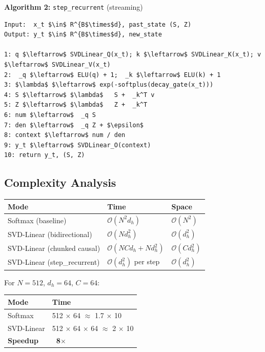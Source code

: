 \textbf{Algorithm 2:} \texttt{step\_recurrent} (streaming)
\begin{lstlisting}
Input:  x_t $\in$ R^{B$\times$d}, past_state (S, Z)
Output: y_t $\in$ R^{B$\times$d}, new_state

1: q $\leftarrow$ SVDLinear_Q(x_t); k $\leftarrow$ SVDLinear_K(x_t); v $\leftarrow$ SVDLinear_V(x_t)
2:  _q $\leftarrow$ ELU(q) + 1;  _k $\leftarrow$ ELU(k) + 1
3: $\lambda$ $\leftarrow$ exp(-softplus(decay_gate(x_t)))
4: S $\leftarrow$ $\lambda$   S +  _k^T v
5: Z $\leftarrow$ $\lambda$   Z +  _k^T
6: num $\leftarrow$  _q S
7: den $\leftarrow$  _q Z + $\epsilon$
8: context $\leftarrow$ num / den
9: y_t $\leftarrow$ SVDLinear_O(context)
10: return y_t, (S, Z)
\end{lstlisting}

\subsection{Complexity Analysis}

\begin{table}[H]
\centering
\small
\begin{tabular}{lll}
\toprule
\textbf{Mode} & \textbf{Time} & \textbf{Space} \\
\midrule
Softmax (baseline) & $\mathcal{O}(N^2 d_h)$ & $\mathcal{O}(N^2)$ \\
SVD-Linear (bidirectional) & $\mathcal{O}(N d_h^2)$ & $\mathcal{O}(d_h^2)$ \\
SVD-Linear (chunked causal) & $\mathcal{O}(N C d_h + N d_h^2)$ & $\mathcal{O}(C d_h^2)$ \\
SVD-Linear (step\_recurrent) & $\mathcal{O}(d_h^2)$ per step & $\mathcal{O}(d_h^2)$ \\
\bottomrule
\end{tabular}
\end{table}

For $N = 512$, $d_h = 64$, $C = 64$:

\begin{table}[H]
\centering
\small
\begin{tabular}{ll}
\toprule
\textbf{Mode} & \textbf{Time} \\
\midrule
Softmax & 512  $\times$ 64 $\approx$ 1.7 $\times$ 10 \\
SVD-Linear & 512 $\times$ 64 $\times$ 64 $\approx$ 2 $\times$ 10 \\
\textbf{Speedup} & \textbf{~8$\times$} \\
\bottomrule
\end{tabular}
\end{table}

